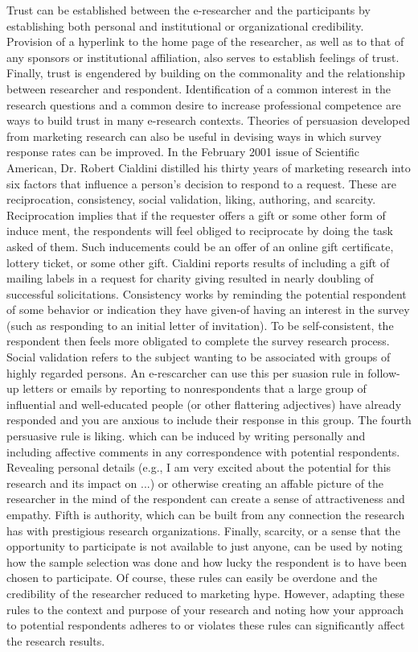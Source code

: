 \documentclass[a4 paper,12pt]{article}
\begin{document}
Trust can be established between the e-researcher and the participants by establishing both personal and institutional or organizational credibility. Provision of a hyperlink to the home page of the researcher, as well as to that of any sponsors or institutional affiliation, also serves to establish feelings of trust. Finally, trust is engendered by building on the commonality and the relationship between researcher and respondent. Identification of a common interest in the research questions and a common desire to increase professional competence are ways to build trust in many e-research contexts. 
Theories of persuasion developed from marketing research can also be useful in devising ways in which survey response rates can be improved. In the February 2001 issue of Scientific American, Dr. Robert Cialdini distilled his thirty years of marketing research into six factors that influence a person's decision to respond to a request. These are reciprocation, consistency, social validation, liking, authoring, and scarcity. Reciprocation implies that if the requester offers a gift or some other form of induce ment, the respondents will feel obliged to reciprocate by doing the task asked of them. Such inducements could be an offer of an online gift certificate, lottery ticket, or some other gift. Cialdini reports results of including a gift of mailing labels in a request for charity giving resulted in nearly doubling of successful solicitations. Consistency works by reminding the potential respondent of some behavior or indication they have given-of having an interest in the survey (such as responding to an initial letter of invitation). To be self-consistent, the respondent then feels more obligated to complete the survey research process. Social validation refers to the subject wanting to be associated with groups of highly regarded persons. An e-rescarcher can use this per suasion rule in follow-up letters or emails by reporting to nonrespondents that a large group of influential and well-educated people (or other flattering adjectives) have already responded and you are anxious to include their response in this group. The fourth persuasive rule is liking. which can be induced by writing personally and including affective comments in any correspondence with potential respondents. Revealing personal details (e.g., I am very excited about the potential for this research and its impact on ...) or otherwise creating an affable picture of the researcher in the mind of the respondent can create a sense of attractiveness and empathy. Fifth is authority, which can be built from any connection the research has with prestigious research organizations. Finally, scarcity, or a sense that the opportunity to participate is not available to just anyone, can be used by noting how the sample selection was done and how lucky the respondent is to have been chosen to participate. Of course, these rules can easily be overdone and the credibility of the researcher reduced to marketing hype. However, adapting these rules to the context and purpose of your research and noting how your approach to potential respondents adheres to or violates these rules can significantly affect the research results. 
\end{document}
